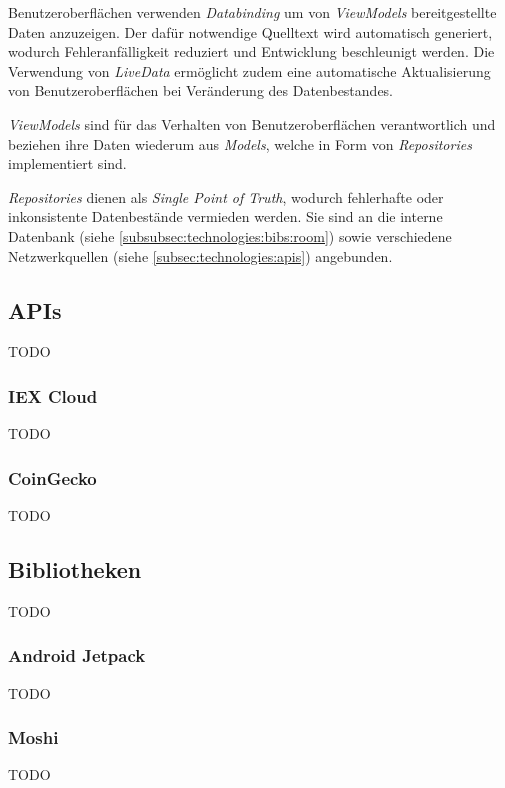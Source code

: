 \documentclass[a4paper]{article}
\begin{document}
Benutzeroberflächen verwenden \textit{Databinding} um von \textit{ViewModels} bereitgestellte Daten anzuzeigen.
Der dafür notwendige Quelltext wird automatisch generiert, wodurch Fehleranfälligkeit reduziert und Entwicklung beschleunigt werden.
Die Verwendung von \textit{LiveData} ermöglicht zudem eine automatische Aktualisierung von Benutzeroberflächen bei Veränderung des Datenbestandes.

\textit{ViewModels} sind für das Verhalten von Benutzeroberflächen verantwortlich und beziehen ihre Daten wiederum aus \textit{Models}, welche in Form von \textit{Repositories} implementiert sind.

\textit{Repositories} dienen als \textit{Single Point of Truth}, wodurch fehlerhafte oder inkonsistente Datenbestände vermieden werden.
Sie sind an die interne Datenbank (siehe \autoref{subsubsec:technologies:bibs:room}) sowie verschiedene Netzwerkquellen (siehe \autoref{subsec:technologies:apis}) angebunden.


\subsection{APIs}
\label{subsec:technologies:apis}
TODO


\subsubsection{IEX Cloud}
\label{subsubsec:technologies:apis:iex}
TODO


\subsubsection{CoinGecko}
\label{subsubsec:technologies:apis:coingecko}
TODO


\subsection{Bibliotheken}
\label{subsec:technologies:bibs}
TODO


\subsubsection{Android Jetpack}
\label{subsubsec:technologies:bibs:jetpack}
TODO


\subsubsection{Moshi}
\label{subsubsec:technologies:bibs:moshi}
TODO
\end{document}
